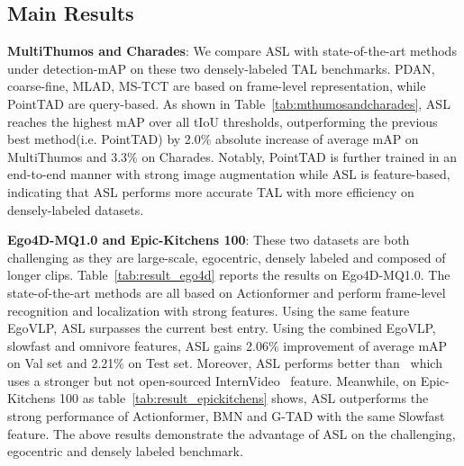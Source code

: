 \documentclass[10pt,twocolumn,letterpaper]{article}
\begin{document}
\subsection{Main Results} 
\textbf{MultiThumos and Charades}: 
We compare ASL with state-of-the-art methods under detection-mAP on these two densely-labeled TAL benchmarks. PDAN\cite{dai2021pdan}, coarse-fine\cite{kahatapitiya2021coarsefine}, MLAD\cite{mlad}, MS-TCT\cite{dai2022mstct} are based on frame-level representation, while PointTAD\cite{tanpointtad} are query-based. As shown in Table~\ref{tab:mthumosandcharades}, ASL reaches the highest mAP over all tIoU thresholds, outperforming the previous best method(i.e. PointTAD) by 2.0\% absolute increase of average mAP on MultiThumos and 3.3\% on Charades. Notably, PointTAD is further trained in an end-to-end manner with strong image augmentation while ASL is feature-based, indicating that ASL performs more accurate TAL with more efficiency on densely-labeled datasets.

\textbf{Ego4D-MQ1.0 and Epic-Kitchens 100}:
These two datasets are both challenging as they are large-scale, egocentric, densely labeled and composed of longer clips. Table~\ref{tab:result_ego4d} reports the results on Ego4D-MQ1.0. The state-of-the-art methods are all based on Actionformer\cite{zhang2022actionformer} and perform frame-level recognition and localization with strong features. 
Using the same feature EgoVLP\cite{kevin2022egovlp}, ASL surpasses the current best entry\cite{ego4dactionformer}. Using the combined EgoVLP, slowfast\cite{slowfast} and omnivore\cite{girdhar2022omnivore} features, ASL gains 2.06\% improvement of average mAP on Val set and 2.21\% on Test set. Moreover, ASL performs better than~\cite{ego4dinternvideo} which uses a stronger but not open-sourced InternVideo~\cite{ego4dinternvideo} feature. 
Meanwhile, on Epic-Kitchens 100 as table~\ref{tab:result_epickitchens} shows, ASL outperforms the strong performance of Actionformer\cite{zhang2022actionformer}, BMN\cite{lin2019bmn} and G-TAD\cite{xu2020gtad} with the same Slowfast feature\cite{slowfast,Damen2022RESCALING}. The above results demonstrate the advantage of ASL on the challenging, egocentric and densely labeled benchmark. 
\end{document}
